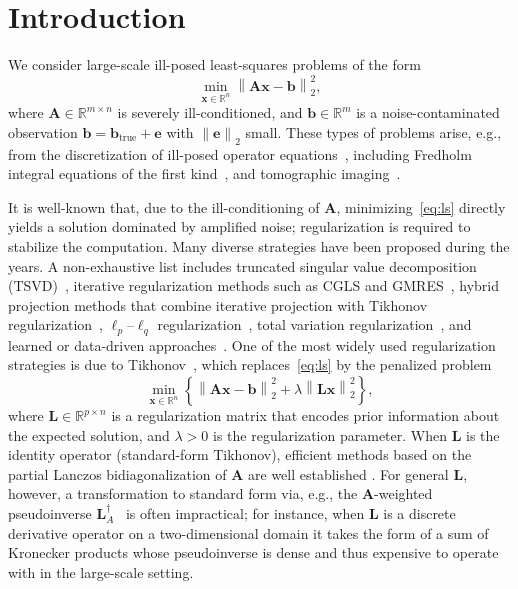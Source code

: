 \documentclass[%
  a4paper,
  onecolumn,
  colorlinks,
]{preprint}
\theoremstyle{plain}
\theoremstyle{definition}
\newcommand{\R}{\ensuremath{\mathbb{R}}}
\newcommand{\norm}[1]{\left\|#1\right\|}
\newcommand{\bA}{\ensuremath{\boldsymbol{A}}}
\newcommand{\bL}{\ensuremath{\boldsymbol{L}}}
\newcommand{\bb}{\mathbf{b}}
\newcommand{\bx}{\mathbf{x}}
\newcommand{\be}{\mathbf{e}}
\begin{document}
\maketitle

\section{Introduction}\label{sec:intro}

We consider large-scale ill-posed least-squares problems of the form  \begin{equation}\label{eq:ls}              \min_{\bx \in \R^n} \norm{\bA\bx - \bb}^2_2, \end{equation}  where $\bA \in \R^{m \times n}$ is severely ill-conditioned, and $\bb \in \R^m$ is a noise-contaminated observation                  $\bb = \bb_{\mathrm{true}} + \be$ with $\norm{\be}_2$ small.                     These types of problems arise, e.g., from the discretization of ill-posed operator  equations~\cite{engl1996regularization,Kirsch2011}, including Fredholm integral      equations of the first kind~\cite{Hansen2010,Groetsch1984}, and tomographic imaging~\cite{Natterer2001,NattererWuebbeling2001}. 

It is well-known that, due to the ill-conditioning of $\bA$, minimizing~\eqref{eq:ls} directly yields a solution dominated by amplified noise; regularization is required to stabilize the computation. Many diverse strategies have been proposed during the years. A non-exhaustive list includes truncated singular value decomposition (TSVD)~\cite{Hansen1987}, iterative regularization methods such as CGLS and GMRES~\cite{Hansen1998,Calvetti2002}, hybrid projection methods that combine iterative projection with Tikhonov regularization~\cite{Chung2008,Gazzola2015,ChungGazzola2024}, $\ell_p$--$\ell_q$ regularization~\cite{Huang2017,Lanza2015}, total variation regularization~\cite{RudinOsherFatemi1992}, and learned or data-driven approaches~\cite{Arridge2019, chung2021efficient}. One of the most widely used regularization strategies is due to Tikhonov~\cite{Tikh63}, which replaces~\eqref{eq:ls} by the penalized problem \begin{equation}\label{eq:tik}
    \min_{\bx \in \R^n} \left\{ \norm{\bA\bx - \bb}_2^2 + \lambda\norm{\bL\bx}_2^2 \right\}, \end{equation} where $\bL \in \R^{p\times n}$ is a regularization matrix that encodes prior information about the expected solution, and $\lambda > 0$ is the regularization parameter.  
When $\bL$ is the identity operator (standard-form Tikhonov), efficient methods based on the partial
Lanczos bidiagonalization of $\bA$ are well established
\cite{PaigeSaunders82, Reichel03, CalvettiReichel03}.
For general $\bL$, however, a transformation to standard form via, e.g., the
$\bA$-weighted pseudoinverse $\bL^\dagger_A$~\cite{Elden84} is often impractical;
for instance, when $\bL$ is a discrete derivative operator on a two-dimensional
domain it takes the form of a sum of Kronecker products whose pseudoinverse is
dense and thus expensive to operate with in the large-scale setting.
\end{document}
